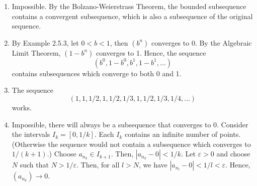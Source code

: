 \documentclass[a4paper]{report}
\newenvironment{ex}[1]
    {\noindent{\large \bf Exercise #1.}}{\vspace{0.5cm}}
\begin{document}
\begin{ex}{2.5.1}
  \begin{enumerate}[label=\alph*)]
  \item Impossible. By the Bolzano-Weierstrass Theorem, the bounded subsequence
    contains a convergent subsequence, which is also a subsequence of the original sequence.
  \item By Example 2.5.3, let $0 < b < 1$, then $(b^n)$ converges to 0. By the Algebraic Limit Theorem,
    $(1 - b^n)$ converges to 1. Hence, the sequence
    \[
       (b^0, 1 - b^0, b^1, 1 - b^1, \dots)
    \]
    contains subsequences which converge to both 0 and 1.
  \item The sequence
    \[
      (1, 1, 1/2, 1, 1/2, 1/3, 1, 1/2, 1/3, 1/4, \dots)
    \]
    works.
  \item Impossible, there will always be a subsequence that converges
    to 0. Consider the intervals $I_k = [0, 1/k]$. Each $I_k$ contains
    an infinite number of points. (Otherwise the sequence would not
    contain a subsequence which converges to $1/(k +1)$.)  Choose
    $a_{n_k} \in I_{k+1}$. Then, $|a_{n_k} - 0| < 1/k$.  Let
    $\varepsilon > 0$ and choose $N$ such that $N > 1/\varepsilon$. Then,
    for all $l > N$, we have $|a_{n_l} - 0| < 1/l < \varepsilon$. Hence,
    $(a_{n_k}) \rightarrow 0$.
  \end{enumerate}
\end{ex}
\end{document}
